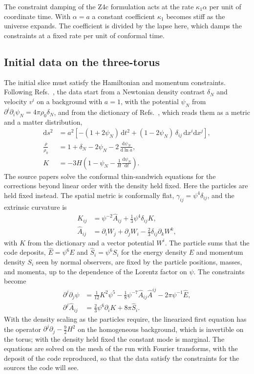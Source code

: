 \documentclass[aps,prd,twocolumn,10pt,superscriptaddress,nofootinbib,longbibliography,floatfix]{revtex4-2}
\newcommand{\dd}{\mathrm{d}}
\newcommand{\psiN}{\psi_N}
\newcommand{\dN}{\delta_N}
\newcommand{\Ahat}{\hat{A}}
\begin{document}
The constraint damping of the Z4c formulation acts at the rate $\kappa_1\alpha$ per unit of coordinate time. With $\alpha = a$ a constant coefficient $\kappa_1$ becomes stiff as the universe expands. The coefficient is divided by the lapse here, which damps the constraints at a fixed rate per unit of conformal time.

\subsection{Initial data on the three-torus}\label{sec:id}

The initial slice must satisfy the Hamiltonian and momentum constraints. Following Refs.~\cite{East:2017qmk,East:2019chx}, the data start from a Newtonian density contrast $\dN$ and velocity $v^i$ on a background with $a = 1$, with the potential $\psiN$ from $\partial^i\partial_i \psiN = 4\pi\rho_0\dN$, and from the dictionary of Refs.~\cite{Chisari:2011iq,Green:2011wc}, which reads them as a metric and a matter distribution,
\begin{align}\label{eq:dict}
\dd s^2 &= a^2\left[-(1+2\psiN)\,\dd t^2 + (1-2\psiN)\,\delta_{ij}\,\dd x^i \dd x^j\right],\nonumber\\
\frac{\rho}{\rho_0} &= 1 + \dN - 2\psiN - 2\,\frac{\dd\psiN}{\dd\ln a},\nonumber\\
K &= -3H\left(1 - \psiN - \frac{1}{H}\frac{\dd\psiN}{\dd t}\right).
\end{align}
The source papers solve the conformal thin-sandwich equations for the corrections beyond linear order with the density held fixed. Here the particles are held fixed instead. The spatial metric is conformally flat, $\gamma_{ij} = \psi^4\delta_{ij}$, and the extrinsic curvature is
\begin{align}
K_{ij} &= \psi^{-2}\Ahat_{ij} + \tfrac{1}{3}\psi^4\delta_{ij}K, \nonumber\\
\Ahat_{ij} &= \partial_i W_j + \partial_j W_i - \tfrac{2}{3}\delta_{ij}\partial_k W^k ,
\end{align}
with $K$ from the dictionary and a vector potential $W^i$. The particle sums that the code deposits, $\hat E = \psi^6 E$ and $\hat S_i = \psi^6 S_i$ for the energy density $E$ and momentum density $S_i$ seen by normal observers, are fixed by the particle positions, masses, and momenta, up to the dependence of the Lorentz factor on $\psi$. The constraints become
\begin{align}\label{eq:constraints}
\partial^j\partial_j\psi &= \tfrac{1}{12}K^2\psi^5 - \tfrac{1}{8}\psi^{-7}\Ahat_{ij}\Ahat^{ij} - 2\pi\psi^{-1}\hat E,\nonumber\\
\partial^j\Ahat_{ij} &= \tfrac{2}{3}\psi^6\partial_i K + 8\pi\hat S_i .
\end{align}
With the density scaling as the particles require, the linearized first equation has the operator $\partial^j\partial_j - \tfrac{9}{2}H^2$ on the homogeneous background, which is invertible on the torus; with the density held fixed the constant mode is marginal. The equations are solved on the mesh of the run with Fourier transforms, with the deposit of the code reproduced, so that the data satisfy the constraints for the sources the code will see.
\end{document}
